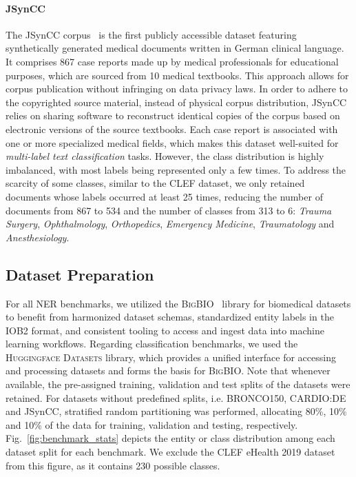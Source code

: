 \paragraph{JSynCC}
The JSynCC corpus~\cite{lohr2018sharing} is the first publicly accessible
dataset featuring synthetically generated medical documents written in German
clinical language. It comprises 867 case reports made up by medical
professionals for educational purposes, which are sourced from 10 medical
textbooks. This approach allows for corpus publication without infringing on
data privacy laws. In order to adhere to the copyrighted source material,
instead of physical corpus distribution, JSynCC relies on sharing software to
reconstruct identical copies of the corpus based on electronic versions of the
source textbooks. Each case report is associated with one or more specialized
medical fields, which makes this dataset well-suited for \textit{multi-label
text classification} tasks. However, the class distribution is highly
imbalanced, with most labels being represented only a few times. To address the
scarcity of some classes, similar to the CLEF dataset, we only retained
documents whose labels occurred at least 25 times, reducing the number of
documents from 867 to 534 and the number of classes from 313 to 6:
\textit{Trauma Surgery}, \textit{Ophthalmology}, \textit{Orthopedics},
\textit{Emergency Medicine}, \textit{Traumatology} and \textit{Anesthesiology}.

\subsection{Dataset Preparation}

For all NER benchmarks, we utilized the \textsc{BigBIO}~\cite{fries2022bigbio}
library for biomedical datasets to benefit from harmonized dataset schemas,
standardized entity labels in the IOB2 format, and consistent tooling to access
and ingest data into machine learning workflows. Regarding classification
benchmarks, we used the \textsc{Huggingface Datasets} \cite{lhoest2021datasets}
library, which provides a unified interface for accessing and processing
datasets and forms the basis for \textsc{BigBIO}. Note that whenever available,
the pre-assigned training, validation and test splits of the datasets were
retained. For datasets without predefined splits, i.e. BRONCO150, CARDIO:DE and
JSynCC, stratified random partitioning was performed, allocating 80\%, 10\% and
10\% of the data for training, validation and testing, respectively.
Fig.~\ref{fig:benchmark_stats} depicts the entity or class distribution among
each dataset split for each benchmark. We exclude the CLEF eHealth 2019 dataset
from this figure, as it contains 230 possible classes.
